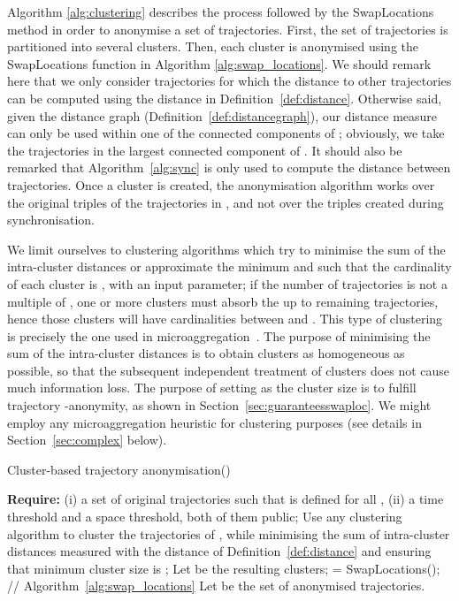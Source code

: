 Algorithm \ref{alg:clustering} describes the process
followed by the SwapLocations method in order to anonymise
a set of trajectories. First, the set of trajectories
is partitioned into several clusters.
Then, each cluster is anonymised
using the SwapLocations function in Algorithm \ref{alg:swap_locations}.
We should remark here that we only consider trajectories
for which the distance to other trajectories can be computed
using the distance in Definition~\ref{def:distance}. Otherwise said,
given the distance graph  (Definition~\ref{def:distancegraph}),
our distance
measure can only be used within one of the connected components of ;
obviously, we take the trajectories in the largest connected component
of .
It should also be remarked that Algorithm~\ref{alg:sync} is only used
to compute the distance between trajectories. Once a cluster 
is created, the anonymisation algorithm works over the original
triples of the trajectories in , and not over the triples created
during synchronisation.

We limit ourselves to clustering algorithms which
try to minimise the sum of the intra-cluster distances or approximate
the minimum and such that the cardinality of each cluster
is , with  an input parameter; if the number of trajectories
is not a multiple of , one or more clusters must absorb the
up to  remaining trajectories, hence those clusters will have
cardinalities between  and .
This type of clustering is precisely the one used in
microaggregation~\cite{domingo02}.
The purpose of minimising the sum of the intra-cluster distances
is to obtain clusters as homogeneous as possible, so that the subsequent
independent treatment of clusters does not cause much information loss.
The purpose of setting  as the cluster size
is to fulfill trajectory -anonymity, as shown in
Section~\ref{sec:guaranteesswaploc}.
We might employ any microaggregation heuristic for clustering
purposes (see details in Section~\ref{sec:complex} below).

\begin{algorithm}[!ht]
\caption{Cluster-based trajectory anonymisation()} \label{alg:clustering}
\begin{algorithmic}[1]
\STATE \textbf{Require:} (i)  a set of original
trajectories such
that  is defined for all , (ii)  a
time threshold and  a space threshold, both of them public;
\STATE Use any clustering algorithm to cluster the trajectories of
, while minimising the sum of intra-cluster distances measured
with the distance of Definition~\ref{def:distance} and ensuring that
minimum cluster size is ;
\STATE Let  be the resulting clusters;
\STATE  = SwapLocations(); \hfill // Algorithm~\ref{alg:swap_locations}
\ENDFOR
\STATE Let 
be the set of anonymised trajectories.
\end{algorithmic}
\vspace*{1mm}
\end{algorithm}

